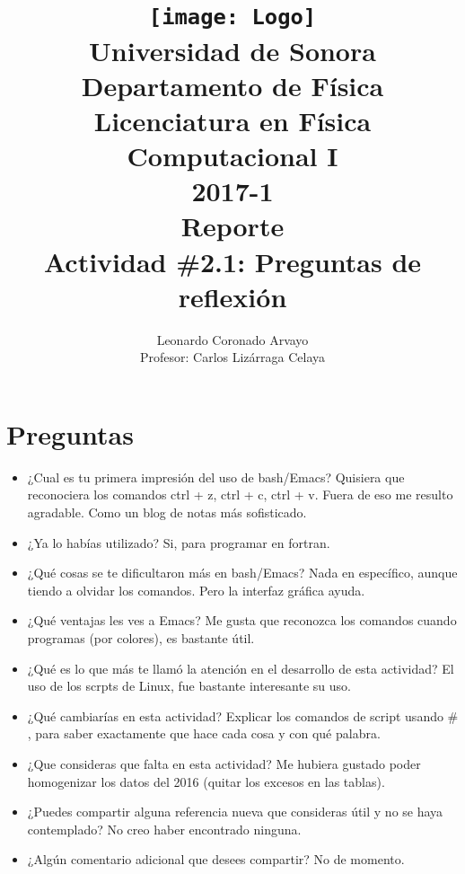 \documentclass[12pt,letterpaper]{article}
\author{
Leonardo Coronado Arvayo\\
Profesor: Carlos Lizárraga Celaya   \vspace*{1.25in}}
\title{	\texttt{[image: Logo]} \\
Universidad de Sonora \\
{\small Departamento de Física \\
Licenciatura en Física \\
Computacional I \\
2017-1 \\
\vspace{0.55in} Reporte}\\ 
{\Huge Actividad \#2.1: Preguntas de reflexión}\\
\vspace*{1.0in}}
\begin{document}
	\maketitle
\newpage


\section{Preguntas}

\begin{itemize}

\item ¿Cual es tu primera impresión del uso de bash/Emacs? Quisiera que reconociera los comandos ctrl + z, ctrl + c, ctrl + v. Fuera de eso me resulto agradable. Como un blog de notas más sofisticado.
\item ¿Ya lo habías utilizado? Si, para programar en fortran. 
\item ¿Qué cosas se te dificultaron más en bash/Emacs?  Nada en específico, aunque tiendo a olvidar los comandos. Pero la interfaz gráfica ayuda.
\item ¿Qué ventajas les ves a Emacs? Me gusta que reconozca los comandos cuando programas (por colores), es bastante útil.
\item ¿Qué es lo que más te llamó la atención en el desarrollo de esta actividad? El uso de los scrpts de Linux, fue bastante interesante su uso.
\item ¿Qué cambiarías en esta actividad? Explicar los comandos de script usando $\#$, para saber exactamente que hace cada cosa y con qué palabra.
\item ¿Que consideras que falta en esta actividad? Me hubiera gustado poder homogenizar los datos del 2016 (quitar los excesos en las tablas).
\item ¿Puedes compartir alguna referencia nueva que consideras útil y no se haya contemplado? No creo haber encontrado ninguna.
\item ¿Algún comentario adicional que desees compartir? No de momento.
 

\end{itemize}
   
\end{document}
